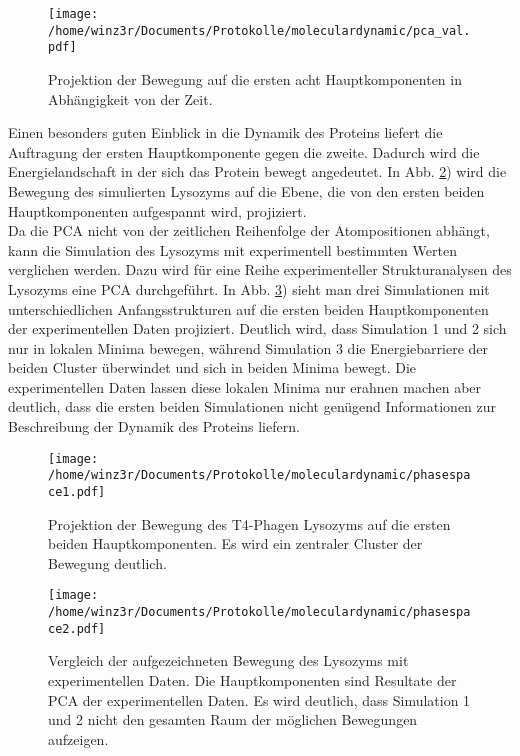 \begin{figure}
\centering
\texttt{[image: /home/winz3r/Documents/Protokolle/moleculardynamic/pca\_val.pdf]}\caption{Projektion der Bewegung auf die ersten acht Hauptkomponenten in Abhängigkeit von der Zeit.}\label{fig:pca_comp}
\end{figure}

Einen besonders guten Einblick in die Dynamik des Proteins liefert die Auftragung der ersten Hauptkomponente gegen die zweite. Dadurch wird die Energielandschaft in der sich das Protein bewegt angedeutet. In Abb. \ref{fig:phasespace1}) wird die Bewegung des simulierten Lysozyms auf die Ebene, die von den ersten beiden Hauptkomponenten aufgespannt wird, projiziert.
\\ \noindent
Da die PCA nicht von der zeitlichen Reihenfolge der Atompositionen abhängt, kann die Simulation des Lysozyms mit experimentell bestimmten Werten verglichen werden.
Dazu wird für eine Reihe experimenteller Strukturanalysen des Lysozyms eine PCA durchgeführt.
In Abb. \ref{fig:exp}) sieht man drei Simulationen mit unterschiedlichen Anfangsstrukturen auf die ersten beiden Hauptkomponenten der experimentellen Daten projiziert.
Deutlich wird, dass Simulation 1 und 2 sich nur in lokalen Minima bewegen, während Simulation 3 die Energiebarriere der beiden Cluster überwindet und sich in beiden Minima bewegt.
Die experimentellen Daten lassen diese lokalen Minima nur erahnen machen aber deutlich, dass die ersten beiden Simulationen nicht genügend Informationen zur Beschreibung der Dynamik des Proteins liefern.

\begin{figure}
\centering
\texttt{[image: /home/winz3r/Documents/Protokolle/moleculardynamic/phasespace1.pdf]}\caption{Projektion der Bewegung des T4-Phagen Lysozyms auf die ersten beiden Hauptkomponenten. Es wird ein zentraler Cluster der Bewegung deutlich.}\label{fig:phasespace1}
\end{figure}

\begin{figure}
\centering
\texttt{[image: /home/winz3r/Documents/Protokolle/moleculardynamic/phasespace2.pdf]}\caption{Vergleich der aufgezeichneten Bewegung des Lysozyms mit experimentellen Daten. Die Hauptkomponenten sind Resultate der PCA der experimentellen Daten. Es wird deutlich, dass Simulation 1 und 2 nicht den gesamten Raum der möglichen Bewegungen aufzeigen.}\label{fig:exp}
\end{figure}
